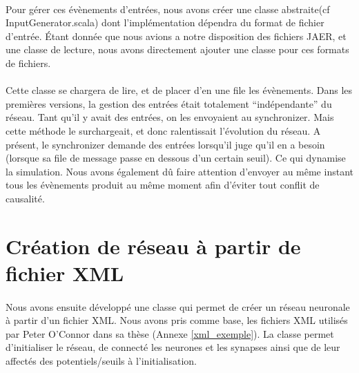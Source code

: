 \documentclass[a4paper,10pt]{article}
\begin{document}
\paragraph{}
Pour gérer ces évènements d’entrées, nous avons créer une classe abstraite(cf InputGenerator.scala) dont l’implémentation dépendra du format de fichier d’entrée. Étant donnée que nous avions a notre disposition des fichiers JAER, et une classe de lecture, nous avons directement ajouter une classe pour ces formats de fichiers.

\paragraph{}
Cette classe se chargera de lire, et de placer d’en une file les évènements. Dans les premières versions, la gestion des entrées était totalement “indépendante” du réseau. Tant qu’il y avait des entrées, on les envoyaient au synchronizer. Mais cette méthode le surchargeait, et donc ralentissait l’évolution du réseau. A présent, le synchronizer demande des entrées lorsqu’il juge qu’il en a besoin (lorsque sa file de message passe en dessous d'un certain seuil). Ce qui dynamise la simulation. Nous avons également dû faire attention d'envoyer au même instant tous les évènements produit au même moment afin d'éviter tout conflit de causalité.

\newpage

\section{Création de réseau à partir de fichier XML}

\paragraph{}
Nous avons ensuite développé une classe qui permet de créer un réseau neuronale à partir d’un fichier XML.
Nous avons pris comme base, les fichiers XML utilisés par Peter O’Connor dans sa thèse (Annexe \ref{xml_exemple}). La classe permet d’initialiser le réseau, de connecté les neurones et les synapses ainsi que de leur affectés des potentiels/seuils à l’initialisation.
\end{document}
